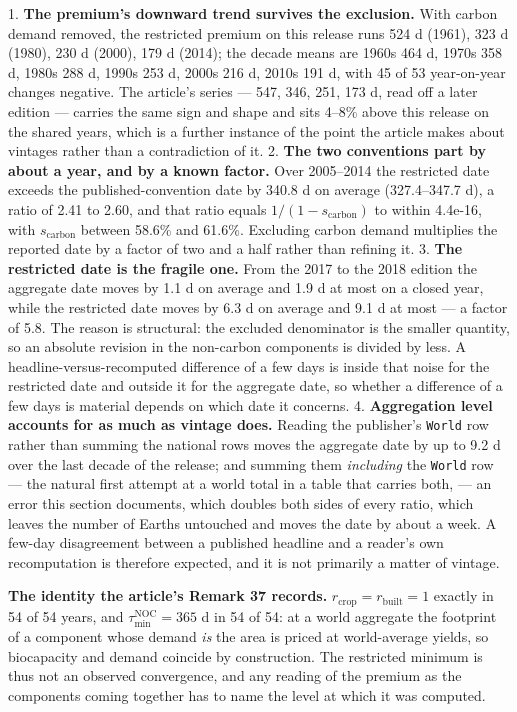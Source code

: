 \documentclass[11pt]{article}
\begin{document}
1. \textbf{The premium's downward trend survives the exclusion.} With carbon demand removed, the restricted premium on this release runs 524 d (1961), 323 d (1980), 230 d (2000), 179 d (2014); the decade means are 1960s 464 d, 1970s 358 d, 1980s 288 d, 1990s 253 d, 2000s 216 d, 2010s 191 d, with 45 of 53 year-on-year changes negative. The article's series --- 547, 346, 251, 173 d, read off a later edition --- carries the same sign and shape and sits 4--8\% above this release on the shared years, which is a further instance of the point the article makes about vintages rather than a contradiction of it. 2. \textbf{The two conventions part by about a year, and by a known factor.} Over 2005--2014 the restricted date exceeds the published-convention date by 340.8 d on average (327.4--347.7 d), a ratio of 2.41 to 2.60, and that ratio equals \(1/(1-s_{\mathrm{carbon}})\) to within 4.4e-16, with \(s_{\mathrm{carbon}}\) between 58.6\% and 61.6\%. Excluding carbon demand multiplies the reported date by a factor of two and a half rather than refining it. 3. \textbf{The restricted date is the fragile one.} From the 2017 to the 2018 edition the aggregate date moves by 1.1 d on average and 1.9 d at most on a closed year, while the restricted date moves by 6.3 d on average and 9.1 d at most --- a factor of 5.8. The reason is structural: the excluded denominator is the smaller quantity, so an absolute revision in the non-carbon components is divided by less. A headline-versus-recomputed difference of a few days is inside that noise for the restricted date and outside it for the aggregate date, so whether a difference of a few days is material depends on which date it concerns. 4. \textbf{Aggregation level accounts for as much as vintage does.} Reading the publisher's \texttt{World} row rather than summing the national rows moves the aggregate date by up to 9.2 d over the last decade of the release; and summing them \emph{including} the \texttt{World} row --- the natural first attempt at a world total in a table that carries both, --- an error this section documents, which doubles both sides of every ratio, which leaves the number of Earths untouched and moves the date by about a week. A few-day disagreement between a published headline and a reader's own recomputation is therefore expected, and it is not primarily a matter of vintage.

\textbf{The identity the article's Remark 37 records.} \(r_{\mathrm{crop}} = r_{\mathrm{built}} = 1\) exactly in 54 of 54 years, and \(\tau_{\min}^{\mathrm{NOC}} = 365\) d in 54 of 54: at a world aggregate the footprint of a component whose demand \emph{is} the area is priced at world-average yields, so biocapacity and demand coincide by construction. The restricted minimum is thus not an observed convergence, and any reading of the premium as the components coming together has to name the level at which it was computed.
\end{document}
